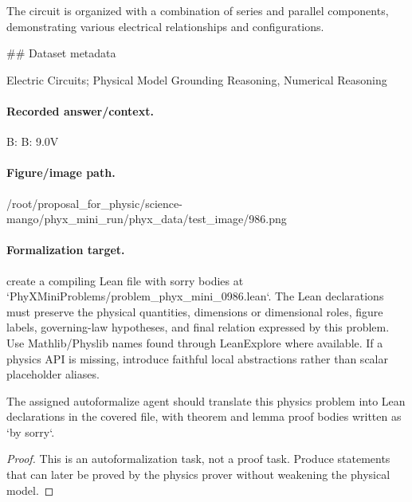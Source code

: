 The circuit is organized with a combination of series and parallel components, demonstrating various electrical relationships and configurations.

\#\# Dataset metadata

Electric Circuits; Physical Model Grounding Reasoning, Numerical Reasoning

\paragraph{Recorded answer/context.}
B: B: 9.0V

\paragraph{Figure/image path.}
/root/proposal\_for\_physic/science-mango/phyx\_mini\_run/phyx\_data/test\_image/986.png

\paragraph{Formalization target.}
create a compiling Lean file with sorry bodies at `PhyXMiniProblems/problem\_phyx\_mini\_0986.lean`. The Lean declarations must preserve the physical quantities, dimensions or dimensional roles, figure labels, governing-law hypotheses, and final relation expressed by this problem.
Use Mathlib/Physlib names found through LeanExplore where available. If a physics API is missing, introduce faithful local abstractions rather than scalar placeholder aliases.

\begin{theorem}
\label{thm:physics:phyx_mini_0986:target}
The assigned autoformalize agent should translate this physics problem into Lean declarations in the covered file, with theorem and lemma proof bodies written as `by sorry`.
\end{theorem}
\begin{proof}
This is an autoformalization task, not a proof task. Produce statements that can later be proved by the physics prover without weakening the physical model.
\end{proof}

